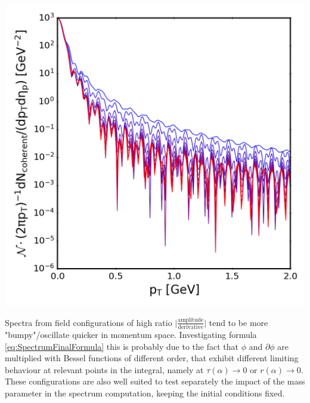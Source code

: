 {\begin{minipage}{\linewidth}
{\begin{minipage}{0.4\linewidth}
                \includegraphics[width=\linewidth]{code/C++/DCCspec/images/spectra_real_constfield_20240822_161734_spec.png}        
            \end{minipage}
        }
    \end{minipage}
}
Spectra from field configurations of high ratio ${\Big\vert\frac{\text{amplitude}}{\text{derivative}}\Big\vert}$ tend to be more "bumpy"/oscillate quicker in momentum space. Investigating formula \eqref{eq:SpectrumFinalFormula} this is probably due to the fact that $\phi$ and $\partial\phi$ are multiplied with Bessel functions of different order, that exhibit different limiting behaviour at relevant points in the integral, namely at ${\tau(\alpha)\to0}$ or ${r(\alpha)\to0}$. These configurations are also well suited to test separately the impact of the mass parameter in the spectrum computation, keeping the initial conditions fixed.\\
